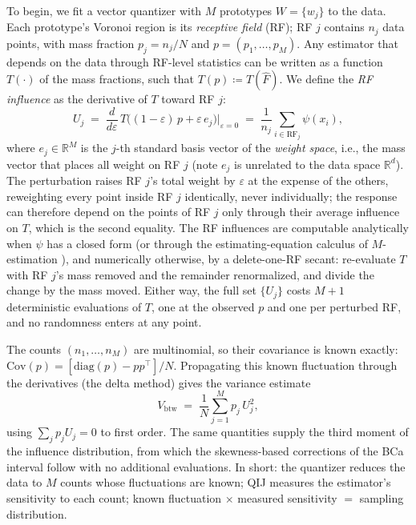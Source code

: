 \documentclass[runningheads]{llncs}
\newcommand{\ifl}{\psi}
\newcommand{\Vcell}{V_{\mathrm{btw}}}
\newcommand{\Fhat}{\hat F}
\begin{document}
To begin, we fit a vector quantizer with $M$ prototypes $W = \{w_j\}$ to the data. Each prototype's Voronoi region is its \emph{receptive field} (RF); RF $j$ contains $n_j$ data points, with mass fraction $p_j = n_j/N$ and $p = (p_1,\dots,p_M)$. Any estimator that depends on the data through RF-level statistics can be written as a function $T(\cdot)$ of the mass fractions, such that $T(p) \coloneq T(\Fhat)$. We define the \emph{RF influence} as the derivative of $T$ toward RF $j$:
\begin{equation}\label{eq:Uj}
U_j \;=\; \frac{d}{d\varepsilon}\,T\bigl((1-\varepsilon)\,p + \varepsilon\, e_j\bigr)\Big|_{\varepsilon = 0}
\;=\; \frac{1}{n_j}\sum_{i \in \mathrm{RF}_j} \ifl(x_i),
\end{equation}
where $e_j \in \mathbb{R}^M$ is the $j$-th standard basis vector of the \emph{weight space}, i.e., the mass vector that places all weight on RF $j$ (note $e_j$ is unrelated to the data space $\mathbb{R}^d$). The perturbation raises RF $j$'s total weight by $\varepsilon$ at the expense of the others, reweighting every point inside RF $j$ identically, never individually; the response can therefore depend on the points of RF $j$ only through their average influence on $T$, which is the second equality. The RF influences are computable analytically when $\ifl$ has a closed form (or through the estimating-equation calculus of $M$-estimation \cite{stefanski2002}), and numerically otherwise, by a delete-one-RF secant: re-evaluate $T$ with RF $j$'s mass removed and the remainder renormalized, and divide the change by the mass moved. Either way, the full set $\{U_j\}$ costs $M{+}1$ deterministic evaluations of $T$, one at the observed $p$ and one per perturbed RF, and no randomness enters at any point.

The counts $(n_1,\dots,n_M)$ are multinomial, so their covariance is known exactly: $\mathrm{Cov}(p) = [\mathrm{diag}(p) - pp^{\top}]/N$. Propagating this known fluctuation through the derivatives (the delta method) gives the variance estimate
\begin{equation}\label{eq:Vcell}
\Vcell \;=\; \frac1N \sum_{j=1}^{M} p_j\, U_j^{2},
\end{equation}
using $\sum_j p_j U_j = 0$ to first order. The same quantities supply the third moment of the influence distribution, from which the skewness-based corrections of the BCa interval \cite{efron1987} follow with no additional evaluations. In short: the quantizer reduces the data to $M$ counts whose fluctuations are known; QIJ measures the estimator's sensitivity to each count; known fluctuation $\times$ measured sensitivity $=$ sampling distribution.
\end{document}
